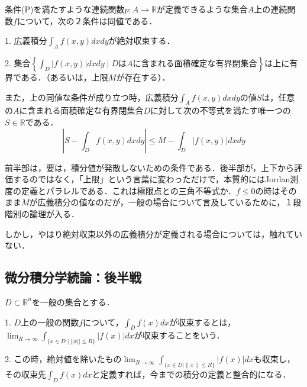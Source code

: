 \documentclass[uplatex, dvipdfmx]{jsreport}
\begin{document}
\begin{shadebox}\begin{proposition}\label{prop-improper-integral}
    条件(P)を満たすような連続関数$p:A\to\mathbb{R}$が定義できるような集合$A$上の連続関数$f$について，次の２条件は同値である．

    1. 広義積分$\int_Af(x,y)dxdy$が絶対収束する．

    2. 集合$\left\{\int_D|f(x,y)|dxdy\mid DはAに含まれる面積確定な有界閉集合\right\}$は上に有界である．（あるいは，上限$M$が存在する）．

    また，上の同値な条件が成り立つ時，広義積分$\int_Af(x,y)dxdy$の値$S$は，任意の$A$に含まれる面積確定な有界閉集合$D$に対して次の不等式を満たす唯一つの$S\in\mathbb{R}$である．
    \[ \left| S-\int_Df(x,y)dxdy \right| \le M-\int_D|f(x,y)|dxdy \]
\end{proposition}\end{shadebox}
\begin{remark*}
    前半部は，要は，積分値が発散しないための条件である．後半部が，上下から評価するのではなく，「上限」という言葉に変わっただけで，本質的にはJordan測度の定義とパラレルである．これは極限点との三角不等式か．$f\le 0$の時はそのまま$M$が広義積分の値なのだが，一般の場合について言及しているために，１段階別の論理が入る．

    しかし，やはり絶対収束以外の広義積分が定義される場合については，触れていない．
\end{remark*}

\subsection{微分積分学続論：後半戦}

\begin{definition*}
    $D\subset\mathbb{R}^n$を一般の集合とする．

    1. $D$上の一般の関数$f$について，$\int_Df(x)dx$が収束するとは，$\lim_{R\to\infty}\int_{\{x\in D\mid ||x||\le R\}}|f(x)|dx$が収束することをいう．

    2. この時，絶対値を除いたもの$\lim_{R\to\infty}\int_{\{x\in D\mid \|x\|\le R\}}|f(x)|dx$も収束し，その収束先$\int_Df(x)dx$と定義すれば，今までの積分の定義と整合的になる．
\end{definition*}
\end{document}
